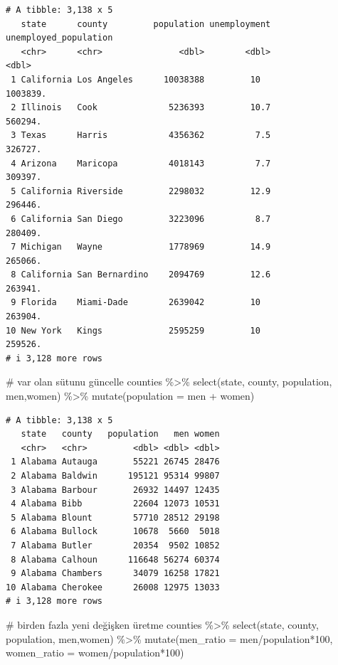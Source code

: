 \documentclass[
  letterpaper,
  DIV=11,
  numbers=noendperiod]{scrreprt}
\newenvironment{Shaded}{\begin{snugshade}}{\end{snugshade}}
\newcommand{\AttributeTok}[1]{\textcolor[rgb]{0.40,0.45,0.13}{#1}}
\newcommand{\CommentTok}[1]{\textcolor[rgb]{0.37,0.37,0.37}{#1}}
\newcommand{\DecValTok}[1]{\textcolor[rgb]{0.68,0.00,0.00}{#1}}
\newcommand{\FunctionTok}[1]{\textcolor[rgb]{0.28,0.35,0.67}{#1}}
\newcommand{\NormalTok}[1]{\textcolor[rgb]{0.00,0.23,0.31}{#1}}
\newcommand{\SpecialCharTok}[1]{\textcolor[rgb]{0.37,0.37,0.37}{#1}}
\begin{document}
\begin{verbatim}
# A tibble: 3,138 x 5
   state      county         population unemployment unemployed_population
   <chr>      <chr>               <dbl>        <dbl>                 <dbl>
 1 California Los Angeles      10038388         10                1003839.
 2 Illinois   Cook              5236393         10.7               560294.
 3 Texas      Harris            4356362          7.5               326727.
 4 Arizona    Maricopa          4018143          7.7               309397.
 5 California Riverside         2298032         12.9               296446.
 6 California San Diego         3223096          8.7               280409.
 7 Michigan   Wayne             1778969         14.9               265066.
 8 California San Bernardino    2094769         12.6               263941.
 9 Florida    Miami-Dade        2639042         10                 263904.
10 New York   Kings             2595259         10                 259526.
# i 3,128 more rows
\end{verbatim}

\begin{Shaded}
\begin{Highlighting}[]
\CommentTok{\# var olan sütunu güncelle}
\NormalTok{counties }\SpecialCharTok{\%\textgreater{}\%}
  \FunctionTok{select}\NormalTok{(state, county, population, men,women) }\SpecialCharTok{\%\textgreater{}\%} 
\FunctionTok{mutate}\NormalTok{(}\AttributeTok{population =}\NormalTok{ men }\SpecialCharTok{+}\NormalTok{ women)}
\end{Highlighting}
\end{Shaded}

\begin{verbatim}
# A tibble: 3,138 x 5
   state   county   population   men women
   <chr>   <chr>         <dbl> <dbl> <dbl>
 1 Alabama Autauga       55221 26745 28476
 2 Alabama Baldwin      195121 95314 99807
 3 Alabama Barbour       26932 14497 12435
 4 Alabama Bibb          22604 12073 10531
 5 Alabama Blount        57710 28512 29198
 6 Alabama Bullock       10678  5660  5018
 7 Alabama Butler        20354  9502 10852
 8 Alabama Calhoun      116648 56274 60374
 9 Alabama Chambers      34079 16258 17821
10 Alabama Cherokee      26008 12975 13033
# i 3,128 more rows
\end{verbatim}

\begin{Shaded}
\begin{Highlighting}[]
\CommentTok{\# birden fazla yeni değişken üretme}
\NormalTok{counties }\SpecialCharTok{\%\textgreater{}\%}
  \FunctionTok{select}\NormalTok{(state, county, population, men,women) }\SpecialCharTok{\%\textgreater{}\%} 
\FunctionTok{mutate}\NormalTok{(}\AttributeTok{men\_ratio =}\NormalTok{ men}\SpecialCharTok{/}\NormalTok{population}\SpecialCharTok{*}\DecValTok{100}\NormalTok{,}
       \AttributeTok{women\_ratio =}\NormalTok{ women}\SpecialCharTok{/}\NormalTok{population}\SpecialCharTok{*}\DecValTok{100}\NormalTok{)}
\end{Highlighting}
\end{Shaded}
\end{document}
